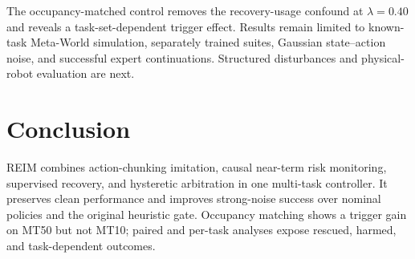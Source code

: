 \documentclass[conference]{IEEEtran}
\newcommand{\noise}{\lambda}
\begin{document}
The occupancy-matched control removes the recovery-usage confound at $\noise=0.40$ and reveals a task-set-dependent trigger effect. Results remain limited to known-task Meta-World simulation, separately trained suites, Gaussian state--action noise, and successful expert continuations. Structured disturbances and physical-robot evaluation are next.

\section{Conclusion}
\label{sec:conclusion}

REIM combines action-chunking imitation, causal near-term risk monitoring, supervised recovery, and hysteretic arbitration in one multi-task controller. It preserves clean performance and improves strong-noise success over nominal policies and the original heuristic gate. Occupancy matching shows a trigger gain on MT50 but not MT10; paired and per-task analyses expose rescued, harmed, and task-dependent outcomes.



\end{document}

